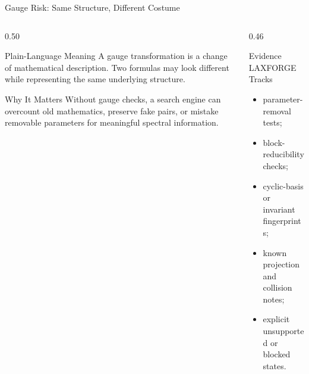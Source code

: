 \documentclass[aspectratio=169,11pt]{beamer}
\begin{document}
\begin{frame}{Gauge Risk: Same Structure, Different Costume}
  \begin{columns}[T,totalwidth=\textwidth]
    \begin{column}{0.50\textwidth}
      \begin{block}{Plain-Language Meaning}
        A gauge transformation is a change of mathematical description. Two
        formulas may look different while representing the same underlying
        structure.
      \end{block}
      \begin{block}{Why It Matters}
        Without gauge checks, a search engine can overcount old mathematics,
        preserve fake pairs, or mistake removable parameters for meaningful
        spectral information.
      \end{block}
    \end{column}
    \begin{column}{0.46\textwidth}
      \begin{block}{Evidence LAXFORGE Tracks}
        \begin{itemize}
          \item parameter-removal tests;
          \item block-reducibility checks;
          \item cyclic-basis or invariant fingerprints;
          \item known projection and collision notes;
          \item explicit unsupported or blocked states.
        \end{itemize}
      \end{block}
    \end{column}
  \end{columns}
\end{frame}
\end{document}
